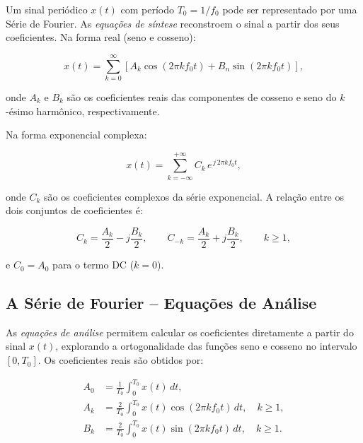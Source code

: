 \documentclass[a4paper,twoside,12pt]{article}
\begin{document}
	Um sinal periódico $x(t)$ com período $T_0 = 1/f_0$ pode ser representado por uma Série de Fourier. As \emph{equações de síntese} reconstroem o sinal a partir dos seus coeficientes. Na forma real (seno e cosseno):
	
	\begin{equation}
		x(t) = \sum_{k=0}^{\infty} \left[ A_k \cos(2\pi k f_0 t) + B_n \sin(2\pi k f_0 t) \right],
		\label{eq:sintese_real}
	\end{equation}
	
	\noindent onde $A_k$ e $B_k$ são os coeficientes reais das componentes de cosseno e seno do $k$-ésimo harmônico, respectivamente.
	
	Na forma exponencial complexa:
	
	\begin{equation}
		x(t) = \sum_{k=-\infty}^{+\infty} C_k \, e^{\,j \, 2\pi k f_0 t},
		\label{eq:sintese_complexa}
	\end{equation}
	
	\noindent onde $C_k$ são os coeficientes complexos da série exponencial. A relação entre os dois conjuntos de coeficientes é:
	
	\begin{equation}
		C_k = \frac{A_k}{2} - j\frac{B_k}{2}, \qquad C_{-k} = \frac{A_k}{2} + j\frac{B_k}{2}, \qquad k \geq 1,
		\label{eq:relacao_coefs}
	\end{equation}
	
	\noindent e $C_0 = A_0$ para o termo DC ($k = 0$).
	
	\subsection{A Série de Fourier -- Equações de Análise}
	
	As \emph{equações de análise} permitem calcular os coeficientes diretamente a partir do sinal $x(t)$, explorando a ortogonalidade das funções seno e cosseno no intervalo $[0, T_0]$. Os coeficientes reais são obtidos por:
	
	\begin{align}
		A_0 &= \frac{1}{T_0} \int_0^{T_0} x(t) \, dt,
		\label{eq:analise_A0} \\[6pt]
		A_k &= \frac{2}{T_0} \int_0^{T_0} x(t) \cos(2\pi k f_0 t) \, dt, \quad k \geq 1,
		\label{eq:analise_Ak} \\[6pt]
		B_k &= \frac{2}{T_0} \int_0^{T_0} x(t) \sin(2\pi k f_0 t) \, dt, \quad k \geq 1.
		\label{eq:analise_Bk}
	\end{align}
	
\end{document}
